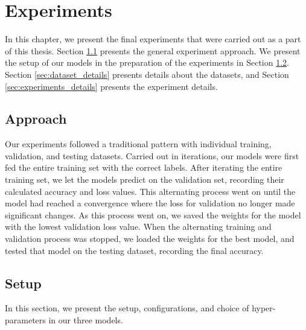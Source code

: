 
\chapter{Experiments}
\label{ch:experiments}
In this chapter, we present the final experiments that were carried out as a part of this thesis. Section \ref{sec:approach} presents the general experiment approach. We present the setup of our models in the preparation of the experiments in Section \ref{sec:setup}. Section \ref{sec:dataset_details} presents details about the datasets, and Section \ref{sec:experiments_details} presents the experiment details.


\section{Approach}
\label{sec:approach}
Our experiments followed a traditional pattern with individual training, validation, and testing datasets. Carried out in iterations, our models were first fed the entire training set with the correct labels. After iterating the entire training set, we let the models predict on the validation set, recording their calculated accuracy and loss values. This alternating process went on until the model had reached a convergence where the loss for validation no longer made significant changes. As this process went on, we saved the weights for the model with the lowest validation loss value. When the alternating training and validation process was stopped, we loaded the weights for the best model, and tested that model on the testing dataset, recording the final accuracy.


\section{Setup}
\label{sec:setup}
In this section, we present the setup, configurations, and choice of hyper-parameters in our three models. 

